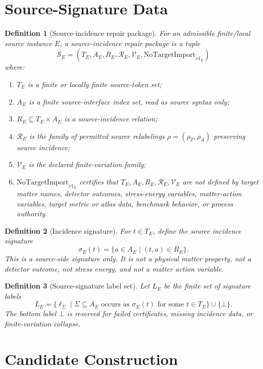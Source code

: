 \documentclass[11pt]{article}
\newcommand{\Bottom}{\bot}
\newcommand{\NoTarget}{\mathrm{NoTargetImport}_{v1}}
\newtheorem{definition}{Definition}
\begin{document}
\section{Source-Signature Data}

\begin{definition}[Source-incidence repair package]
For an admissible finite/local source instance \(E\), a source-incidence repair
package is a tuple
\[
  \mathcal{S}_E=(T_E,A_E,R_E,\mathcal{R}_E,\mathcal{V}_E,\NoTarget_E)
\]
where:
\begin{enumerate}[label=(\alph*)]
\item \(T_E\) is a finite or locally finite source-token set;
\item \(A_E\) is a finite source-interface index set, read as source syntax
  only;
\item \(R_E\subseteq T_E\times A_E\) is a source-incidence relation;
\item \(\mathcal{R}_E\) is the family of permitted source relabelings
  \(\rho=(\rho_T,\rho_A)\) preserving source incidence;
\item \(\mathcal{V}_E\) is the declared finite-variation family;
\item \(\NoTarget_E\) certifies that \(T_E,A_E,R_E,\mathcal{R}_E,\mathcal{V}_E\)
  are not defined by target matter names, detector outcomes, stress-energy
  variables, matter-action variables, target metric or atlas data, benchmark
  behavior, or process authority.
\end{enumerate}
\end{definition}

\begin{definition}[Incidence signature]
For \(t\in T_E\), define the source incidence signature
\[
  \sigma_E(t)=\{a\in A_E \mid (t,a)\in R_E\}.
\]
This is a source-side signature only. It is not a physical matter property,
not a detector outcome, not stress energy, and not a matter action variable.
\end{definition}

\begin{definition}[Source-signature label set]
Let \(L_E\) be the finite set of signature labels
\[
  L_E=\{\ell_{\Sigma} \mid \Sigma\subseteq A_E
  \text{ occurs as } \sigma_E(t) \text{ for some } t\in T_E\}\cup\{\Bottom\}.
\]
The bottom label \(\Bottom\) is reserved for failed certificates, missing
incidence data, or finite-variation collapse.
\end{definition}

\section{Candidate Construction}
\end{document}
